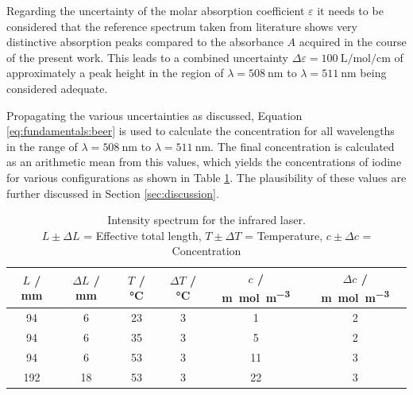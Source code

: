 Regarding the uncertainty of the molar absorption coefficient $\varepsilon$ it needs to be considered that the reference spectrum taken from literature \cite{Iodine} shows very distinctive absorption peaks compared to the absorbance $A$ acquired in the course of the present work. This leads to a combined uncertainty $\Delta \varepsilon = \SI{100}{\L\per\mol\per\cm}$ of approximately a peak height in the region of $\lambda = \SI{508}{\nm}$ to $\lambda = \SI{511}{\nm}$ being considered adequate.

Propagating the various uncertainties as discussed, Equation \ref{eq:fundamentals:beer} is used to calculate the concentration for all wavelengths in the range of $\lambda = \SI{508}{\nm}$ to $\lambda = \SI{511}{\nm}$. The final concentration is calculated as an arithmetic mean from this values, which yields the concentrations of iodine for various configurations as shown in Table \ref{tab:evaluation:concentration}. The plausibility of these values are further discussed in Section \ref{sec:discussion}.

\begin{table}[H]
    \centering
    \caption{Intensity spectrum for the infrared laser. \\
    $L \pm \Delta L$ = Effective total length, $T \pm \Delta T$ = Temperature, $c \pm \Delta c$ = Concentration}
    \label{tab:evaluation:concentration}
    \begin{tabular}{cccccc}
    \hline
    $L$ / mm & $\Delta L$ / mm & $T$ / \si{\celsius} & $\Delta T$ / \si{\celsius} & $c$ / \si{\m\mol\per\m^3} & $\Delta c$ / \si{\m\mol\per\m^3} \\ \hline
    94 & 6 & 23 & 3 & 1 & 2 \\
    94 & 6 & 35 & 3 & 5 & 2 \\
    94 & 6 & 53 & 3 & 11 & 3 \\
    192 & 18 & 53 & 3 & 22 & 3 \\ \hline
    \end{tabular}
\end{table}

\newpage